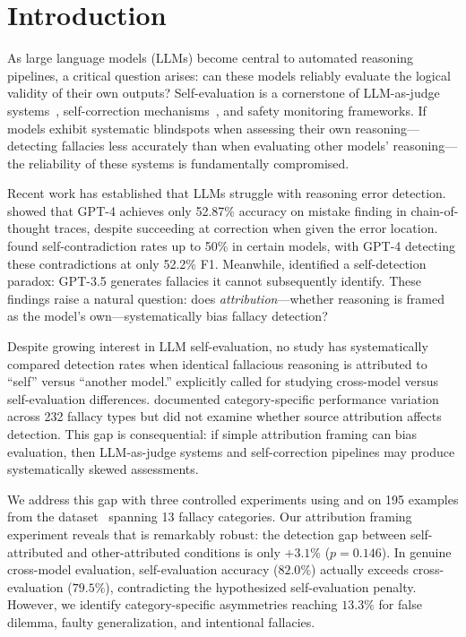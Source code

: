 \section{Introduction}
\label{sec:intro}

As large language models (LLMs) become central to automated reasoning pipelines, a critical question arises: can these models reliably evaluate the logical validity of their own outputs? Self-evaluation is a cornerstone of LLM-as-judge systems~\citep{zheng2023judging}, self-correction mechanisms~\citep{madaan2023selfrefine}, and safety monitoring frameworks. If models exhibit systematic blindspots when assessing their own reasoning---detecting fallacies less accurately than when evaluating other models' reasoning---the reliability of these systems is fundamentally compromised.

Recent work has established that LLMs struggle with reasoning error detection. \citet{tyen2024llms} showed that GPT-4 achieves only 52.87\% accuracy on mistake finding in chain-of-thought traces, despite succeeding at correction when given the error location. \citet{liu2024self} found self-contradiction rates up to 50\% in certain models, with GPT-4 detecting these contradictions at only 52.2\% F1. Meanwhile, \citet{payandeh2023susceptible} identified a self-detection paradox: GPT-3.5 generates fallacies it cannot subsequently identify. These findings raise a natural question: does \emph{attribution}---whether reasoning is framed as the model's own---systematically bias fallacy detection?

Despite growing interest in LLM self-evaluation, no study has systematically compared detection rates when identical fallacious reasoning is attributed to ``self'' versus ``another model.'' \citet{tyen2024llms} explicitly called for studying cross-model versus self-evaluation differences. \citet{hong2024closer} documented category-specific performance variation across 232 fallacy types but did not examine whether source attribution affects detection. This gap is consequential: if simple attribution framing can bias evaluation, then LLM-as-judge systems and self-correction pipelines may produce systematically skewed assessments.

We address this gap with three controlled experiments using \gptfull and \gptmini on 195 examples from the \logicdataset dataset~\citep{jin2022logical} spanning 13 fallacy categories. Our attribution framing experiment reveals that \gptfull is remarkably robust: the detection gap between self-attributed and other-attributed conditions is only $+3.1\%$ ($p = 0.146$). In genuine cross-model evaluation, self-evaluation accuracy ($82.0\%$) actually exceeds cross-evaluation ($79.5\%$), contradicting the hypothesized self-evaluation penalty. However, we identify category-specific asymmetries reaching $13.3\%$ for false dilemma, faulty generalization, and intentional fallacies.

